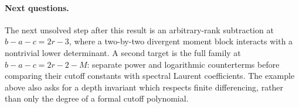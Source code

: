 \paragraph{Next questions.}
The next unsolved step after this result is an arbitrary-rank
subtraction at $b-a-c=2r-3$, where a two-by-two divergent moment
block interacts with a nontrivial lower determinant.  A second
target is the full family at $b-a-c=2r-2-M$: separate power and
logarithmic counterterms before comparing their cutoff constants
with spectral Laurent coefficients.  The example above also asks
for a depth invariant which respects finite differencing, rather
than only the degree of a formal cutoff polynomial.

